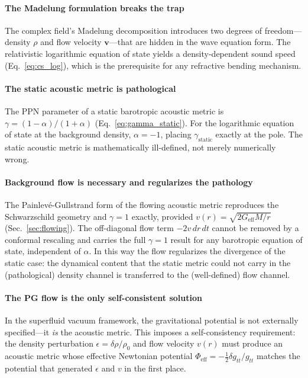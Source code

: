 \documentclass[12pt, a4paper]{article}
\begin{document}
\paragraph{The Madelung formulation breaks the trap}
The complex field's Madelung decomposition introduces two degrees of freedom---density $\rho$ and flow velocity $\mathbf{v}$---that are hidden in the wave equation form. The relativistic logarithmic equation of state yields a density-dependent sound speed (Eq.~\ref{eq:cs_log}), which is the prerequisite for any refractive bending mechanism.

\paragraph{The static acoustic metric is pathological}
The PPN parameter of a static barotropic acoustic metric is $\gamma = (1-\alpha)/(1+\alpha)$ (Eq.~\ref{eq:gamma_static}). For the logarithmic equation of state at the background density, $\alpha = -1$, placing $\gamma_{\mathrm{static}}$ exactly at the pole. The static acoustic metric is mathematically ill-defined, not merely numerically wrong.

\paragraph{Background flow is necessary and regularizes the pathology}
The Painlev\'{e}-Gullstrand form of the flowing acoustic metric reproduces the Schwarzschild geometry and $\gamma = 1$ exactly, provided $v(r) = \sqrt{2G_{\mathrm{eff}}M/r}$ (Sec.~\ref{sec:flowing}). The off-diagonal flow term $-2v\,dr\,dt$ cannot be removed by a conformal rescaling and carries the full $\gamma = 1$ result for any barotropic equation of state, independent of $\alpha$. In this way the flow regularizes the divergence of the static case: the dynamical content that the static metric could not carry in the (pathological) density channel is transferred to the (well-defined) flow channel.

\paragraph{The PG flow is the only self-consistent solution}
In the superfluid vacuum framework, the gravitational potential is not externally specified---it \emph{is} the acoustic metric. This imposes a self-consistency requirement: the density perturbation $\epsilon = \delta\rho/\rho_0$ and flow velocity $v(r)$ must produce an acoustic metric whose effective Newtonian potential $\Phi_{\mathrm{eff}} = -\tfrac{1}{2}\delta g_{tt}/g_{tt}$ matches the potential that generated $\epsilon$ and $v$ in the first place.
\end{document}
